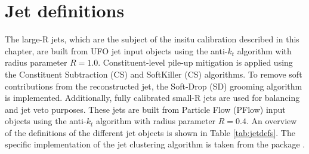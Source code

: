 \section{Jet definitions \label{sec:jetdef}}
The large-R jets, which are the subject of the insitu calibration described in this chapter, are built from UFO jet input objects \cite{Atlas:UFO} using the anti-$k_t$ algorithm \cite{Insitu:antikt} with radius parameter $R=1.0$. Constituent-level pile-up mitigation is applied using the Constituent Subtraction (CS) \cite{Insitu:cs} and SoftKiller (CS) \cite{Insitu:sk} algorithms. To remove soft contributions from the reconstructed jet, the Soft-Drop (SD) grooming algorithm \cite{Insitu:softdrop} is implemented. Additionally, fully calibrated small-R jets \cite{Atlas:PFlow2,Insitu:smallrcali} are used for \pt balancing and jet veto purposes. These jets are built from Particle Flow (PFlow) \cite{Atlas:PFlow} input objects using the anti-$k_t$ algorithm with radius parameter $R=0.4$. An overview of the definitions of the different jet objects is shown in Table \ref{tab:jetdefs}. The specific implementation of the jet clustering algorithm is taken from the \FASTJET package \cite{Insitu:fastjet1,Insitu:fastjet2}.

